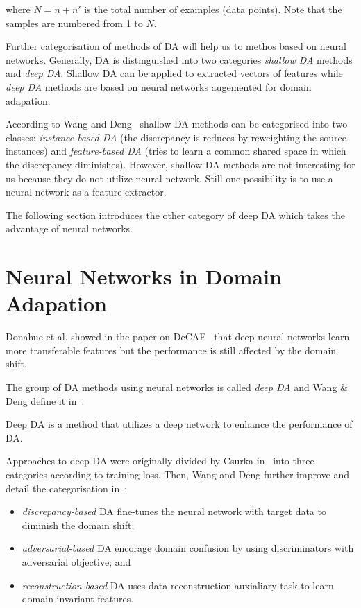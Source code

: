 where \(N = n + n'\) is the total number of examples (data points).
Note that the samples are numbered from 1 to \(N\).

Further categorisation of methods of DA
will help us to methos based on neural networks.
Generally, DA is distinguished into two categories
\textit{shallow DA} methods and \textit{deep DA}.
Shallow DA can be applied to extracted vectors of features
while \textit{deep DA} methods are based on neural networks
augemented for domain adapation.~\cite{csurka2017}

According to Wang and Deng~\cite{wang2018} shallow DA methods
can be categorised into two classes:
\textit{instance-based DA}
(the discrepancy is reduces by reweighting the source instances)
and \textit{feature-based DA}
(tries to learn a common shared space in which the discrepancy diminishes).
However, shallow DA methods are not interesting for us
because they do not utilize neural network.
Still one possibility is to use a neural network as a feature extractor.~\cite{csurka2017}

The following section introduces the other category of deep DA
which takes the advantage of neural networks.

\section{Neural Networks in Domain Adapation}

Donahue et al. showed in the paper on DeCAF~\cite{donahue2014}
that deep neural networks learn more transferable features
but the performance is still affected by the domain shift.


The group of DA methods using neural networks is called \textit{deep DA}
and Wang \& Deng define it in~\cite{wang2018}:

Deep DA is a method that utilizes a deep network to enhance the performance of DA.

Approaches to deep DA were originally divided by Csurka in~\cite{csurka2017}
into three categories according to training loss.
Then, Wang and Deng further improve and detail the categorisation in~\cite{wang2018}:

\begin{itemize}
	\item \textit{discrepancy-based} DA fine-tunes the neural network
		with target data to diminish the domain shift;
	\item \textit{adversarial-based} DA encorage domain confusion
		by using discriminators with adversarial objective; and
	\item \textit{reconstruction-based} DA uses data reconstruction auxialiary task to learn domain invariant features.
\end{itemize}

